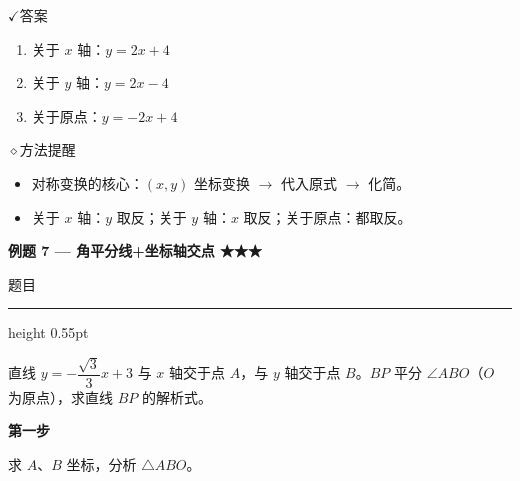\documentclass{exam-zh}
\newcommand{\eduSectionTitle}[1]{%
  \needspace{5\baselineskip}%
  \vspace{2mm}
  {\color{edu-blue}\bfseries\large #1}\par
  \vspace{3mm}
}
\newenvironment{eduSubQuestionItem}[1]{%
  \needspace{4\baselineskip}%
  \vspace{2mm}
  \par\noindent
  \hangindent=8mm\hangafter=1
  {\color{edu-blue}\bfseries #1}\enspace
  \begingroup
  \color{edu-ink}
}{%
  \endgroup
  \par
  \vspace{3mm}
}
\newcommand{\eduIconCheck}{\(\checkmark\)}
\newcommand{\eduIconPin}{\(\diamond\)}
\newenvironment{eduProblemBlock}[1][题目]{%
  \needspace{8\baselineskip}
  {\small\color{edu-muted}#1}\par
  \vspace{1.5mm}
  {\color{edu-blue}\hrule height 0.55pt}
  \vspace{4.5mm}
  \begingroup
  \color{edu-ink}
  \large
  \setlength{\parskip}{2.2mm}
  \linespread{1.20}\selectfont
}{%
  \par
  \endgroup
  \vspace{6mm}
}
\newenvironment{eduBulletList}{%
  \begin{itemize}[
    label=\textbullet,
    leftmargin=5mm,
    itemsep=1.2mm,
    topsep=0pt,
    parsep=0pt
  ]
}{%
  \end{itemize}
}
\newenvironment{eduBottomGrid}{%
  \vspace{1mm}
  \par\noindent
}{%
  \par\vspace{1mm}
}
\newenvironment{eduSummaryLeft}{%
  \begin{minipage}[t]{0.30\linewidth}
}{%
  \end{minipage}
}
\newcommand{\eduSummaryDivider}{%
  \hspace{4mm}{\color{edu-line}\vrule width 0.35pt}\hspace{7mm}%
}
\newenvironment{eduSummaryRight}{%
  \begin{minipage}[t]{0.58\linewidth}
}{%
  \end{minipage}
}
\newenvironment{eduPlainList}{%
  \begin{enumerate}[
    label=(\arabic*),
    leftmargin=7mm,
    itemsep=1.2mm,
    topsep=0pt,
    parsep=0pt
  ]
}{%
  \end{enumerate}
}
\begin{document}
\begin{eduBottomGrid}
  \begin{eduSummaryLeft}
    \begin{eduSummaryBlock}{\eduIconCheck}{答案}
    \begin{eduPlainList}
      \item 关于 $x$ 轴：$y = 2x + 4$      \item 关于 $y$ 轴：$y = 2x - 4$      \item 关于原点：$y = -2x + 4$    \end{eduPlainList}
    \end{eduSummaryBlock}
  \end{eduSummaryLeft}
  \eduSummaryDivider
  \begin{eduSummaryRight}
    \begin{eduSummaryBlock}{\eduIconPin}{方法提醒}
    \begin{eduBulletList}
      \item 对称变换的核心：$(x, y)$ 坐标变换 $\to$ 代入原式 $\to$ 化简。      \item 关于 $x$ 轴：$y$ 取反；关于 $y$ 轴：$x$ 取反；关于原点：都取反。    \end{eduBulletList}
    \end{eduSummaryBlock}
  \end{eduSummaryRight}
\end{eduBottomGrid}



\eduSectionTitle{例题 7 — 角平分线+坐标轴交点 ★★★}

\begin{eduProblemBlock}[题目]
直线 $y = -\dfrac{\sqrt{3}}{3}x + 3$ 与 $x$ 轴交于点 $A$，与 $y$ 轴交于点 $B$。$BP$ 平分 $\angle ABO$（$O$ 为原点），求直线 $BP$ 的解析式。
\end{eduProblemBlock}





\begin{eduSubQuestionItem}{第一步}
求 $A$、$B$ 坐标，分析 $\triangle ABO$。\end{eduSubQuestionItem}
\end{document}
